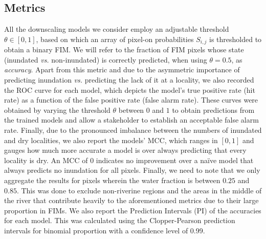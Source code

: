 \subsection{Metrics} 
All the downscaling models we consider employ an adjustable threshold $\theta \in [0,1]$, based on which an array of pixel-on probabilities $S_{i,j}$ is thresholded to obtain a binary \ac{FIM}. We will refer to the fraction of \ac{FIM} pixels whose state (inundated \textit{vs.} non-inundated) is correctly predicted, when using $\theta = 0.5$, as \textit{accuracy}. Apart from this metric and due to the asymmetric importance of predicting inundation \textit{vs.} predicting the lack of it at a locality, we also recorded the \ac{ROC} curve for each model, which depicts the model's true positive rate (hit rate) as a function of the false positive rate (false alarm rate). These curves were obtained by varying the threshold $\theta$ between $0$ and $1$ to obtain predictions from the trained models and allow a stakeholder to establish an acceptable false alarm rate. Finally, due to the pronounced imbalance between the numbers of inundated and dry localities, we also report the models' \acf{MCC}, which ranges in $[0,1]$ and gauges how much more accurate a model is over always predicting that every locality is dry. An \ac{MCC} of $0$ indicates no improvement over a na\"ive model that always predicts no inundation for all pixels. Finally, we need to note that we only aggregate the results for pixels wherein the water fraction is between $0.25$ and $0.85$. This was done to exclude non-riverine regions and the areas in the middle of the river that contribute heavily to the aforementioned metrics due to their large proportion in \acp{FIM}. We also report the Prediction Intervals (PI) of the accuracies for each model. This was calculated using the Clopper-Pearson \cite{ClopperPearsonPI1934} prediction intervals for binomial proportion with a confidence level of 0.99.


